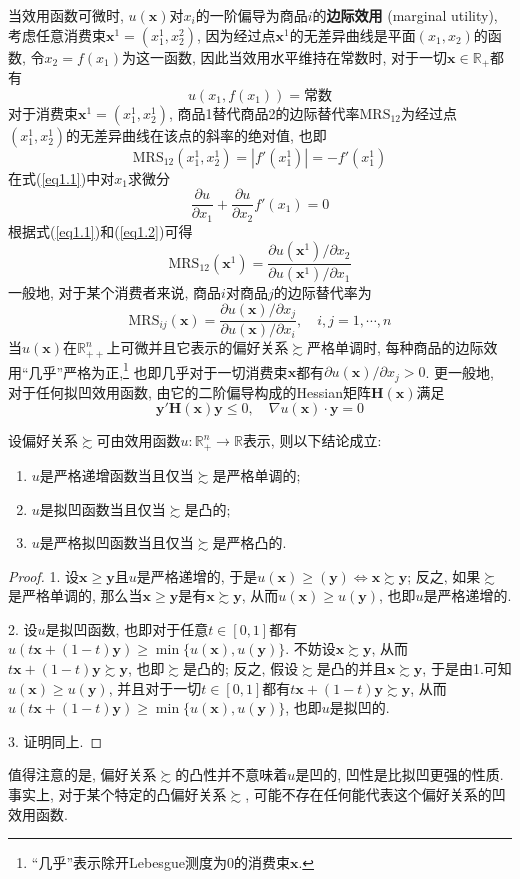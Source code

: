 \documentclass[cn, 12pt, math=mtpro2, bibstyle=apa, blue, twocol]{elegantbook}
\newcommand{\R}{\mathbb{R}}
\newcommand{\x}{\mathbf{x}}
\begin{document}
当效用函数可微时, $u(\x)$对$x_i$的一阶偏导为商品$i$的\textbf{边际效用} (marginal utility), 考虑任意消费束$\x^1=(x^1_1,x^2_2)$, 因为经过点$\x^1$的无差异曲线是平面$(x_1,x_2)$的函数, 令$x_2=f(x_1)$为这一函数, 因此当效用水平维持在常数时, 对于一切$\x\in\R_+$都有
\begin{equation}\label{eq1.1}
  u(x_1,f(x_1))=\text{常数}
\end{equation}
对于消费束$\x^1=(x^1_1,x^1_2)$, 商品1替代商品2的边际替代率$\text{MRS}_{12}$为经过点$(x_1^1,x_2^1)$的无差异曲线在该点的斜率的绝对值, 也即
$$\text{MRS}_{12}(x_1^1,x_2^1)=|f'(x_1^1)|=-f'(x_1^1)$$
在式(\ref{eq1.1})中对$x_1$求微分
\begin{equation}\label{eq1.2}
  \frac{\partial u}{\partial x_1}+\frac{\partial u}{\partial x_2}f'(x_1)=0
\end{equation}
根据式(\ref{eq1.1})和(\ref{eq1.2})可得
$$\text{MRS}_{12}(\x^1)=\frac{\partial u(\x^1)/\partial x_2}{\partial u(\x^1)/\partial x_1}$$
一般地, 对于某个消费者来说, 商品$i$对商品$j$的边际替代率为
$$\text{MRS}_{ij}(\x)=\frac{\partial u(\x)/\partial x_j}{\partial u(\x)/\partial x_i},\quad i,j=1,\cdots,n$$
当$u(\x)$在$\R^n_{++}$上可微并且它表示的偏好关系$\succsim$严格单调时, 每种商品的边际效用“几乎”严格为正,\footnote{“几乎”表示除开Lebesgue测度为0的消费束$\x$.} 也即几乎对于一切消费束$\x$都有$\partial u(\x)/\partial x_j>0$. 更一般地, 对于任何拟凹效用函数, 由它的二阶偏导构成的Hessian矩阵$\mathbf{H}(\x)$满足
$$\mathbf{y}'\mathbf{H}(\x)\mathbf{y}\le0,\quad \nabla u(\x)\cdot\mathbf{y}=0$$

  \begin{theorem}\label{thm:thm1.2}
    设偏好关系$\succsim$可由效用函数$u:\R_+^n\to\R$表示, 则以下结论成立:
    \begin{enumerate}[label=\arabic*.]
      \item $u$是严格递增函数当且仅当$\succsim$是严格单调的;
      \item $u$是拟凹函数当且仅当$\succsim$是凸的;
      \item $u$是严格拟凹函数当且仅当$\succsim$是严格凸的.
    \end{enumerate}
  \end{theorem}
  \begin{proof}
    1. 设$\x\ge \mathbf{y}$且$u$是严格递增的, 于是$u(\x)\geq (\mathbf{y})\Leftrightarrow \x\succsim \mathbf{y}$; 反之, 如果$\succsim$是严格单调的, 那么当$\x\ge\mathbf{y}$是有$\x\succsim\mathbf{y}$, 从而$u(\x)\ge u(\mathbf{y})$, 也即$u$是严格递增的.

    2. 设$u$是拟凹函数, 也即对于任意$t\in [0,1]$都有$u(t\x+(1-t)\mathbf{y})\geq \min\{u(\x), u(\mathbf{y})\}$. 不妨设$\x\succsim \mathbf{y}$, 从而$t\x+(1-t)\mathbf{y}\succsim \mathbf{y}$, 也即$\succsim$是凸的; 反之, 假设$\succsim$是凸的并且$\x\succsim\mathbf{y}$, 于是由1.可知$u(\x)\ge u(\mathbf{y})$, 并且对于一切$t\in[0,1]$都有$t\x+(1-t)\mathbf{y}\succsim \mathbf{y}$, 从而$u(t\x+(1-t)\mathbf{y})\geq \min\{u(\x), u(\mathbf{y})\}$, 也即$u$是拟凹的.

    3. 证明同上.
  \end{proof}
  值得注意的是, 偏好关系$\succsim$的凸性并不意味着$u$是凹的, 凹性是比拟凹更强的性质. 事实上, 对于某个特定的凸偏好关系$\succsim$, 可能不存在任何能代表这个偏好关系的凹效用函数.
\end{document}
